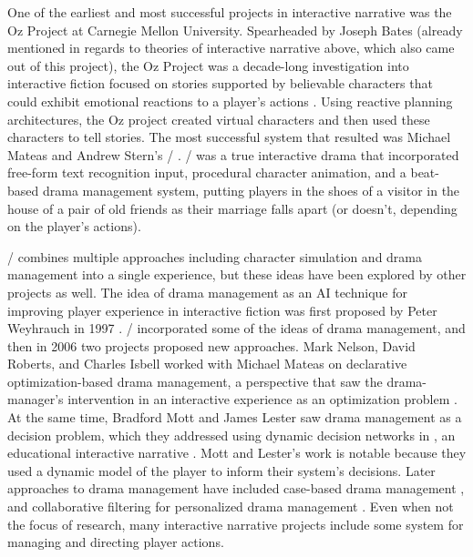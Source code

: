 One of the earliest and most successful projects in interactive narrative was the Oz Project at Carnegie Mellon University.
%
Spearheaded by Joseph Bates (already mentioned in regards to theories of interactive narrative above, which also came out of this project), the Oz Project was a decade-long investigation into interactive fiction focused on stories supported by believable characters that could exhibit emotional reactions to a player's actions \citep{Bates1992}.
%
Using reactive planning architectures, the Oz project created virtual characters and then used these characters to tell stories.
%
The most successful system that resulted was Michael Mateas and Andrew Stern's \facade/ \citep{Mateas2002b}.
%
\facade/ was a true interactive drama that incorporated free-form text recognition input, procedural character animation, and a beat-based drama management system, putting players in the shoes of a visitor in the house of a pair of old friends as their marriage falls apart (or doesn't, depending on the player's actions).


\facade/ combines multiple approaches including character simulation and drama management into a single experience, but these ideas have been explored by other projects as well.
%
The idea of drama management as an AI technique for improving player experience in interactive fiction was first proposed by Peter Weyhrauch in 1997 \citep{Weyhrauch1997}.
%
\facade/ incorporated some of the ideas of drama management, and then in 2006 two projects proposed new approaches.
%
Mark Nelson, David Roberts, and Charles Isbell worked with Michael Mateas on declarative optimization-based drama management, a perspective that saw the drama-manager's intervention in an interactive experience as an optimization problem \citep{Nelson2006}.
%
At the same time, Bradford Mott and James Lester saw drama management as a decision problem, which they addressed using dynamic decision networks in , an educational interactive narrative \citep{Mott2006}.
%
Mott and Lester's work is notable because they used a dynamic model of the player to inform their system's decisions.
%
Later approaches to drama management have included case-based drama management \citep{Sharma2010}, and collaborative filtering for personalized drama management \citep{Yu2013}.
%
Even when not the focus of research, many interactive narrative projects include some system for managing and directing player actions.


